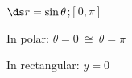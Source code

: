 {$\ds r=\sin\theta$;\quad $[0,\pi]$}
{In polar: $\theta = 0 \ \cong \ \theta = \pi$

In rectangular: $y=0$
}
